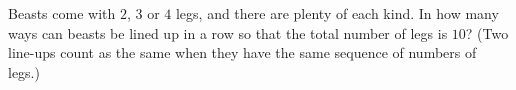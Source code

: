 Beasts come with $2$, $3$ or $4$ legs, and there are plenty of each kind. In how many ways can beasts be lined up in a row so that the total number of legs is $10$? (Two line-ups count as the same when they have the same sequence of numbers of legs.)
